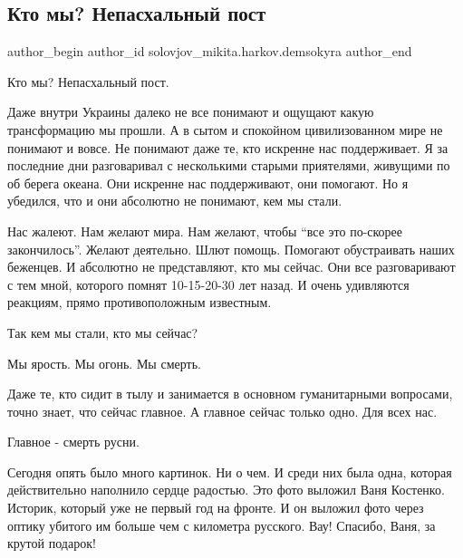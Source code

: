  
 
 
 
 
 
\subsection{Кто мы? Непасхальный пост}
\label{sec:24_04_2022.tg.solovjov_mikita.harkov.demsokyra.1.kto_my_nepashalnyj_post}
 
\ifcmt
 author_begin
   author_id solovjov_mikita.harkov.demsokyra
 author_end
\fi

Кто мы? Непасхальный пост.

Даже внутри Украины далеко не все понимают и ощущают какую трансформацию мы
прошли. А в сытом и спокойном цивилизованном мире не понимают и вовсе. Не
понимают даже те, кто искренне нас поддерживает. Я за последние дни
разговаривал с несколькими старыми приятелями, живущими по об берега океана.
Они искренне нас поддерживают, они помогают. Но я убедился, что и они абсолютно
не понимают, кем мы стали. 

Нас жалеют. Нам желают мира. Нам желают, чтобы \enquote{все это по-скорее закончилось}.
Желают деятельно. Шлют помощь. Помогают обустраивать наших беженцев. И
абсолютно не представляют, кто мы сейчас. Они все разговаривают с тем мной,
которого помнят 10-15-20-30 лет назад. И очень удивляются реакциям, прямо
противоположным известным. 

Так кем мы стали, кто мы сейчас?

Мы ярость. Мы огонь. Мы смерть. 

Даже те, кто сидит в тылу и занимается в основном гуманитарными вопросами,
точно знает, что сейчас главное. А главное сейчас только одно. Для всех нас. 

Главное - смерть русни.

Сегодня опять было много картинок. Ни о чем. И среди них была одна, которая
действительно наполнило сердце радостью. Это фото выложил Ваня Костенко.
Историк, который уже не первый год на фронте. И он выложил фото через оптику
убитого им больше чем с километра русского. Вау! Спасибо, Ваня, за крутой
подарок!

